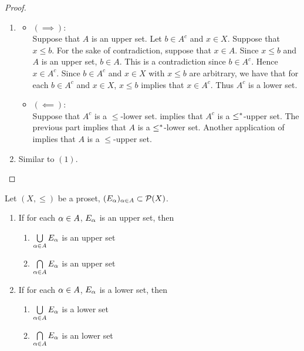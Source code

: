 \documentclass{book}
\begin{document}
	\begin{proof}\
		\begin{enumerate}
			\item 
			\begin{itemize}
				\item $(\implies)$: \\
				Suppose that $A$ is an upper set. Let $b \in A^c$ and $x \in X$. Suppose that $x \leq b$. For the sake of contradiction, suppose that $x \in A$. Since $x \leq b$ and $A$ is an upper set, $b \in A$. This is a contradiction since $b \in A^c$. Hence $x \in A^c$. Since $b \in A^c$ and $x \in X$ with $x \leq b$ are arbitrary, we have that for each $b \in A^c$ and $x \in X$, $x \leq b$ implies that $x \in A^c$. Thus $A^c$ is a lower set.
				\item $(\impliedby)$: \\
				Suppose that $A^c$ is a $\leq$-lower set.  implies that $A^c$ is a $\leq^*$-upper set. The previous part implies that $A$ is a $\leq^*$-lower set. Another application of  implies that $A$ is a $\leq$-upper set. 
			\end{itemize}
			\item Similar to $(1)$.
		\end{enumerate}
	\end{proof}
	
	\begin{ex} 
		Let $(X, \leq)$ be a proset, $(E_{\alpha})_{\alpha \in A} \subset \mathcal{P}(X)$. 
		\begin{enumerate}
			\item If for each $\alpha \in A$, $E_{\alpha}$ is an upper set, then 
			\begin{enumerate}
				\item $\bigcup\limits_{\alpha \in A} E_{\alpha}$ is an upper set
				\item $\bigcap\limits_{\alpha \in A} E_{\alpha}$ is an upper set
			\end{enumerate}
			\item If for each $\alpha \in A$, $E_{\alpha}$ is a lower set, then 
			\begin{enumerate}
				\item $\bigcup\limits_{\alpha \in A} E_{\alpha}$ is a lower set
				\item $\bigcap\limits_{\alpha \in A} E_{\alpha}$ is an lower set
			\end{enumerate}
		\end{enumerate}
	\end{ex}
	
\end{document}
